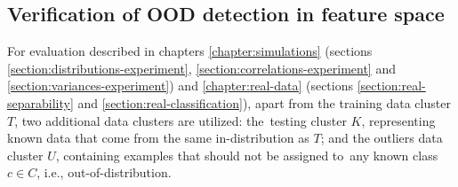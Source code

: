 \subsection{Verification of OOD detection in feature space}
\label{section:verification}

For evaluation described in chapters \ref{chapter:simulations} (sections \ref{section:distributions-experiment}, \ref{section:correlations-experiment} and \ref{section:variances-experiment}) and \ref{chapter:real-data} (sections \ref{section:real-separability} and \ref{section:real-classification}), apart from the training data cluster $T$, two additional data clusters are utilized: the~testing cluster $K$, representing known data that come from the same in-distribution as $T$; and the outliers data cluster $U$, containing examples that should not be assigned to~any known class $c \in C$, i.e., out-of-distribution.

